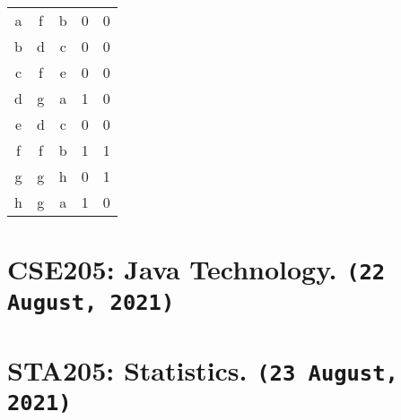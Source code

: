\documentclass[11pt]{article}
\begin{document}
\begin{table}
	\begin{tabular}{| c | c | c | c | c |}
		 a & f & b  & 0 & 0 \\
		 b & d & c & 0 & 0 \\
		 c & f & e & 0 & 0 \\
		 d & g & a & 1 & 0 \\
		 e & d & c & 0 & 0 \\
		 f & f & b & 1 & 1 \\
		 g & g & h & 0 & 1 \\
		 h & g & a & 1 & 0 \\
	\end{tabular}
	\centering
\end{table}

\pagebreak
\section*{CSE205: Java Technology. \texttt{(22 August, 2021)}}

\pagebreak
\section*{STA205: Statistics. \texttt{(23 August, 2021)}}
\end{document}
